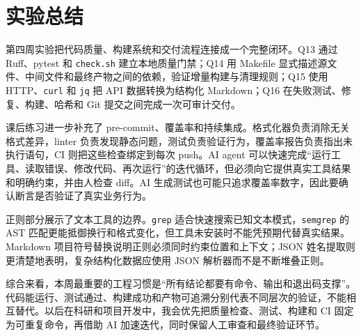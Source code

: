\documentclass[UTF8,12pt,a4paper]{ctexart}
\begin{document}
\section{实验总结}

第四周实验把代码质量、构建系统和交付流程连接成一个完整闭环。Q13 通过 Ruff、pytest 和 \texttt{check.sh} 建立本地质量门禁；Q14 用 Makefile 显式描述源文件、中间文件和最终产物之间的依赖，验证增量构建与清理规则；Q15 使用 HTTP、\texttt{curl} 和 \texttt{jq} 把 API 数据转换为结构化 Markdown；Q16 在失败测试、修复、构建、哈希和 Git 提交之间完成一次可审计交付。

课后练习进一步补充了 pre-commit、覆盖率和持续集成。格式化器负责消除无关格式差异，linter 负责发现静态问题，测试负责验证行为，覆盖率报告负责指出未执行语句，CI 则把这些检查绑定到每次 push。AI agent 可以快速完成“运行工具、读取错误、修改代码、再次运行”的迭代循环，但必须向它提供真实工具结果和明确约束，并由人检查 diff。AI 生成测试也可能只追求覆盖率数字，因此要确认断言是否验证了真实业务行为。

正则部分展示了文本工具的边界。\texttt{grep} 适合快速搜索已知文本模式，\texttt{semgrep} 的 AST 匹配更能抵御换行和格式变化，但工具未安装时不能凭预期代替真实结果。Markdown 项目符号替换说明正则必须同时约束位置和上下文；JSON 姓名提取则更清楚地表明，复杂结构化数据应使用 JSON 解析器而不是不断堆叠正则。

综合来看，本周最重要的工程习惯是“所有结论都要有命令、输出和退出码支撑”。代码能运行、测试通过、构建成功和产物可追溯分别代表不同层次的验证，不能相互替代。以后在科研和项目开发中，我会优先把质量检查、测试、构建和 CI 固定为可重复命令，再借助 AI 加速迭代，同时保留人工审查和最终验证环节。
\end{document}
